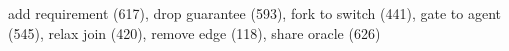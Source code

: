 add requirement (617), drop guarantee (593), fork to switch (441), gate to agent (545), relax join (420), remove edge (118), share oracle (626)
